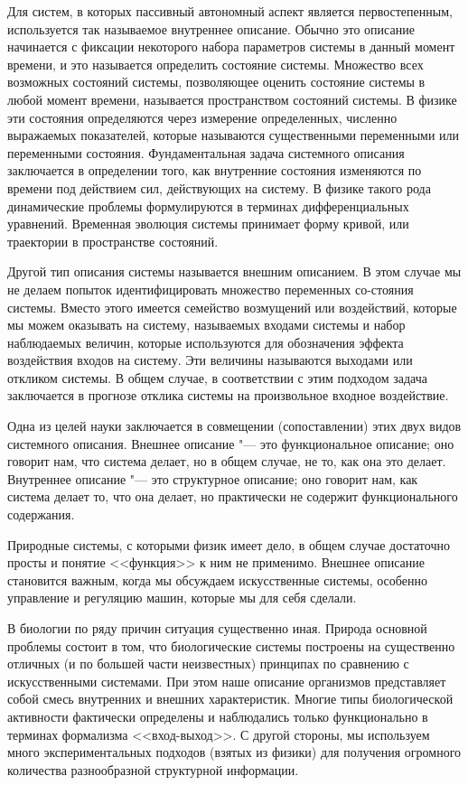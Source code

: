 \documentclass[12pt,a4paper,oneside]{book}
\begin{document}
Для систем, в которых пассивный автономный аспект является первостепенным, используется так называемое внутреннее описание. Обычно это описание начинается с фиксации некоторого набора параметров системы в данный момент времени, и это называется определить состояние системы. Множество всех возможных состояний системы, позволяющее оценить состояние системы в любой момент времени, называется пространством состояний системы. В физике эти состояния определяются через измерение определенных, численно выражаемых показателей, которые называются существенными переменными или переменными состояния. Фундаментальная задача системного описания заключается в определении того, как внутренние состояния изменяются по времени под действием сил, действующих на систему. В физике такого рода динамические проблемы формулируются в терминах дифференциальных уравнений. Временная эволюция системы принимает форму кривой, или траектории в пространстве состояний.

Другой тип описания системы называется внешним описанием. В этом случае мы не делаем попыток идентифицировать множество переменных со-стояния системы. Вместо этого имеется семейство возмущений или воздействий, которые мы можем оказывать на систему, называемых входами системы и набор наблюдаемых величин, которые используются для обозначения эффекта воздействия входов на систему. Эти величины называются выходами или откликом системы. В общем случае, в соответствии с этим подходом задача заключается в прогнозе отклика системы на произвольное входное воздействие.

Одна из целей науки заключается в совмещении (сопоставлении) этих двух видов системного описания. Внешнее описание "--- это функциональное описание; оно говорит нам, что система делает, но в общем случае, не то, как она это делает. Внутреннее описание "--- это структурное описание; оно говорит нам, как система делает то, что она делает, но практически не содержит функционального содержания. 

Природные системы, с которыми физик имеет дело, в общем случае достаточно просты и понятие <<функция>> к ним не применимо. Внешнее описание становится важным, когда мы обсуждаем искусственные системы, особенно управление и регуляцию машин, которые мы для себя сделали.

В биологии по ряду причин ситуация существенно иная. Природа основной проблемы состоит в том, что биологические системы построены на существенно отличных (и по большей части неизвестных) принципах по сравнению с искусственными системами. При этом наше описание организмов представляет собой смесь внутренних и внешних характеристик. Многие типы биологической активности фактически определены и наблюдались только функционально в терминах формализма <<вход-выход>>. С другой стороны, мы используем много экспериментальных подходов (взятых из физики) для получения огромного количества разнообразной структурной информации.
\end{document}
